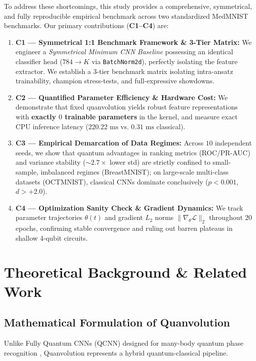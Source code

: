 \documentclass[runningheads]{llncs}
\begin{document}
To address these shortcomings, this study provides a comprehensive, symmetrical, and fully reproducible empirical benchmark across two standardized MedMNIST benchmarks. Our primary contributions (\textbf{C1--C4}) are:
\begin{enumerate}
    \item \textbf{C1 --- Symmetrical 1:1 Benchmark Framework \& 3-Tier Matrix:} We engineer a \textit{Symmetrical Minimum CNN Baseline} possessing an identical classifier head ($784 \to K$ via \texttt{BatchNorm2d}), perfectly isolating the feature extractor. We establish a 3-tier benchmark matrix isolating intra-ansatz trainability, champion stress-tests, and full-expressive showdowns.
    \item \textbf{C2 --- Quantified Parameter Efficiency \& Hardware Cost:} We demonstrate that fixed quanvolution yields robust feature representations with \textbf{exactly $0$ trainable parameters} in the kernel, and measure exact CPU inference latency ($220.22\text{ ms}$ vs. $0.31\text{ ms}$ classical).
    \item \textbf{C3 --- Empirical Demarcation of Data Regimes:} Across $10$ independent seeds, we show that quantum advantages in ranking metrics (ROC/PR-AUC) and variance stability ($\sim 2.7\times$ lower std) are strictly confined to small-sample, imbalanced regimes (BreastMNIST); on large-scale multi-class datasets (OCTMNIST), classical CNNs dominate conclusively ($p < 0.001$, $d > +2.0$).
    \item \textbf{C4 --- Optimization Sanity Check \& Gradient Dynamics:} We track parameter trajectories $\theta(t)$ and gradient $L_2$ norms $\|\nabla_\theta \mathcal{L}\|_2$ throughout $20$ epochs, confirming stable convergence and ruling out barren plateaus in shallow 4-qubit circuits.
\end{enumerate}

\section{Theoretical Background \& Related Work}

\subsection{Mathematical Formulation of Quanvolution}
Unlike Fully Quantum CNNs (QCNN) designed for many-body quantum phase recognition \cite{cong2019quantum}, Quanvolution \cite{henderson2020quanvolutional} represents a hybrid quantum-classical pipeline.
\end{document}
